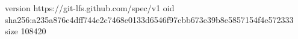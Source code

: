 version https://git-lfs.github.com/spec/v1
oid sha256:a235a876c4dff744e2c7468e0133d6546f97cbb673e39b8e5857154f4e572333
size 108420

